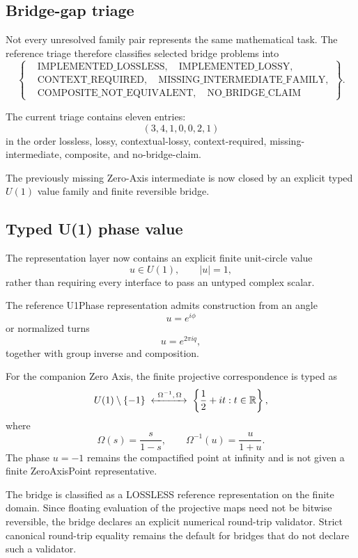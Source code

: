 \documentclass[11pt]{article}
\begin{document}
\subsection{Bridge-gap triage}

Not every unresolved family pair represents the same mathematical task. The
reference triage therefore classifies selected bridge problems into
\[
\left\{
\begin{aligned}
&\mathrm{IMPLEMENTED\_LOSSLESS},\quad \mathrm{IMPLEMENTED\_LOSSY},\\
&\mathrm{CONTEXT\_REQUIRED},\quad \mathrm{MISSING\_INTERMEDIATE\_FAMILY},\\
&\mathrm{COMPOSITE\_NOT\_EQUIVALENT},\quad \mathrm{NO\_BRIDGE\_CLAIM}
\end{aligned}
\right\}.
\]

The current triage contains eleven entries:
\[
(3,4,1,0,0,2,1)
\]
in the order lossless, lossy, contextual-lossy, context-required,
missing-intermediate, composite, and no-bridge-claim.

The previously missing Zero-Axis intermediate is now closed by an explicit
typed \(U(1)\) value family and finite reversible bridge.

\subsection{Typed U(1) phase value}

The representation layer now contains an explicit finite unit-circle value
\[
u\in U(1),
\qquad
|u|=1,
\]
rather than requiring every interface to pass an untyped complex scalar.

The reference U1Phase representation admits construction from an angle
\[
u=e^{i\phi}
\]
or normalized turns
\[
u=e^{2\pi iq},
\]
together with group inverse and composition.

For the companion Zero Axis, the finite projective correspondence is typed as
\[
U(1)\setminus\{-1\}
\;\xleftrightarrow{\ \Omega^{-1},\,\Omega\ }\;
\left\{\frac12+it:t\in\mathbb R\right\},
\]
where
\[
\Omega(s)=\frac{s}{1-s},
\qquad
\Omega^{-1}(u)=\frac{u}{1+u}.
\]
The phase \(u=-1\) remains the compactified point at infinity and is not given a
finite ZeroAxisPoint representative.

The bridge is classified as a LOSSLESS reference representation on the finite
domain. Since floating evaluation of the projective maps need not be bitwise
reversible, the bridge declares an explicit numerical round-trip validator.
Strict canonical round-trip equality remains the default for bridges that do
not declare such a validator.
\end{document}
